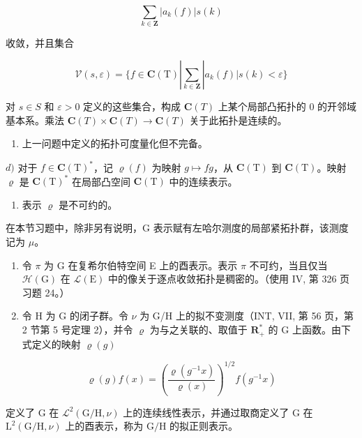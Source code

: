 \[
\sum_ {k \in \mathbf {Z}} | a _ {k} (f) | s (k)
\]

收敛，并且集合

\[
\mathcal {V} (s, \varepsilon) = \{f \in \mathbf {C} (\mathrm{T}) | \sum_ {k \in \mathbf {Z}} | a _ {k} (f) | s (k) <   \varepsilon \}
\]

对 \(s \in S\) 和 \(\varepsilon > 0\) 定义的这些集合，构成 \(\mathbf{C}(T)\) 上某个局部凸拓扑的 0 的开邻域基本系。乘法 \(\mathbf{C}(T) \times \mathbf{C}(T) \to \mathbf{C}(T)\) 关于此拓扑是连续的。

\begin{enumerate}
\def\labelenumi{\alph{enumi})}
\setcounter{enumi}{2}
\tightlist
\item
  上一问题中定义的拓扑可度量化但不完备。
\end{enumerate}

\(d)\) 对于 \(f \in \mathbf{C}(\mathrm{T})^*\)，记 \(\varrho(f)\) 为映射 \(g \mapsto fg\)，从 \(\mathbf{C}(\mathrm{T})\) 到 \(\mathbf{C}(\mathrm{T})\)。映射 \(\varrho\) 是 \(\mathbf{C}(\mathrm{T})^*\) 在局部凸空间 \(\mathbf{C}(\mathrm{T})\) 中的连续表示。

\begin{enumerate}
\def\labelenumi{\alph{enumi})}
\setcounter{enumi}{4}
\tightlist
\item
  表示 \(\varrho\) 是不可约的。
\end{enumerate}

\exercisesection{}

在本节习题中，除非另有说明，G 表示赋有左哈尔测度的局部紧拓扑群，该测度记为 \(\mu\)。

\begin{enumerate}
\def\labelenumi{\arabic{enumi})}
\item
  令 \(\pi\) 为 G 在复希尔伯特空间 E 上的酉表示。表示 \(\pi\) 不可约，当且仅当 \(\mathcal{H}(\mathrm{G})\) 在 \(\mathcal{L}(\mathrm{E})\) 中的像关于逐点收敛拓扑是稠密的。（使用 IV, 第 326 页习题 24。）
\item
  令 H 为 G 的闭子群。令 \(\nu\) 为 G/H 上的拟不变测度（INT, VII, 第 56 页，第 2 节第 5 号定理 2），并令 \(\varrho\) 为与之关联的、取值于 \(\mathbf{R}_{+}^{*}\) 的 G 上函数。由下式定义的映射 \(\varrho(g)\)
\end{enumerate}

\[
\varrho (g) f (x) = \left(\frac {\varrho (g ^ {- 1} x)}{\varrho (x)}\right) ^ {1 / 2} f (g ^ {- 1} x)
\]

定义了 G 在 \(\mathcal{L}^{2}(\mathrm{G / H},\nu)\) 上的连续线性表示，并通过取商定义了 G 在 \(\mathrm{L}^2 (\mathrm{G / H},\nu)\) 上的酉表示，称为 \(\mathrm{G / H}\) 的拟正则表示。

